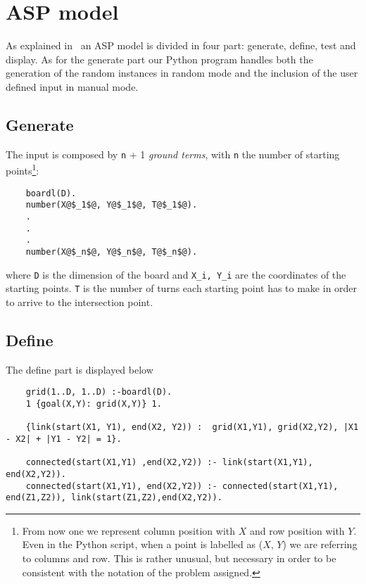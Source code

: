 \section{ASP model}
As explained in~\cite{ClingoGuide} an ASP model is divided in four part: generate, define, test and display.
As for the generate part our Python program handles both the generation of the random instances in random mode and the inclusion of the user defined input in manual mode.
\subsection{Generate}
The input is composed by \texttt{n} + 1 \emph{ground terms}, with \texttt{n} the number of starting points\footnote{From now one we represent column position with $X$ and row position with $Y$. Even in the Python script, when a point is labelled as ($X$, $Y$) we are referring to columns and row. This is rather unusual, but necessary in order to be consistent with the notation of the problem assigned.}:
\begin{verbatim}
    boardl(D).
    number(X@$_1$@, Y@$_1$@, T@$_1$@).
    .
    .
    .
    number(X@$_n$@, Y@$_n$@, T@$_n$@).
\end{verbatim}
where \texttt{D} is the dimension of the board and \texttt{X_i, Y_i} are the coordinates of the starting points. \texttt{T} is the number of turns each starting point has to make in order to arrive to the intersection point.

\subsection{Define}\label{sec:asp-define}
The define part is displayed below
\begin{verbatim}
    grid(1..D, 1..D) :-boardl(D).
    1 {goal(X,Y): grid(X,Y)} 1.
    
    {link(start(X1, Y1), end(X2, Y2)) :  grid(X1,Y1), grid(X2,Y2), |X1 - X2| + |Y1 - Y2| = 1}. 
    
    connected(start(X1,Y1) ,end(X2,Y2)) :- link(start(X1,Y1), end(X2,Y2)).
    connected(start(X1,Y1), end(X2,Y2)) :- connected(start(X1,Y1), end(Z1,Z2)), link(start(Z1,Z2),end(X2,Y2)). 
\end{verbatim}

